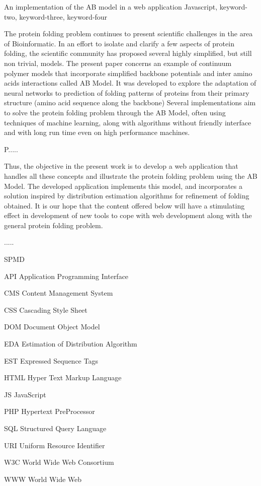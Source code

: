 \documentclass[dm,ppgcomp]{texfurg}
\begin{document}
\begin{englishabstract}
  {An implementation of the AB model in a web application}
  {Javascript, keyword-two, keyword-three, keyword-four}

The protein folding problem continues to present scientific challenges in the area of Bioinformatic. In an effort to isolate and clarify a few aspects of protein folding, the scientific community has proposed several highly simplified, but still non trivial, models. The present paper concerns an example of continuum polymer models that incorporate simplified backbone potentials and inter amino acids interactions called AB Model. It was developed to explore the adaptation of neural networks to prediction of folding patterns of proteins from their primary structure (amino acid sequence along the backbone) Several implementations aim to solve the protein folding problem through the AB Model, often using techniques of machine learning, along with algorithms without friendly interface and with long run time even on high performance machines.

P.....

Thus, the objective in the present work is to develop a web application that handles all these concepts and illustrate the protein folding problem using the AB Model. The developed application implements this model, and incorporates a solution inspired by distribution estimation algorithms for refinement of folding obtained. It is our hope that the content offered below will have a stimulating effect in development of new tools to cope with web development  along with the general protein folding problem.

.....

\end{englishabstract}

\listoffigures

\listoftables

\begin{listofabbrv}{SPMD}

        \item[API] Application Programming Interface
        \item[CMS] Content Management System
        \item[CSS] Cascading Style Sheet
        \item[DOM] Document Object Model
        \item[EDA] Estimation of Distribution Algorithm
        \item[EST] Expressed Sequence Tags
        \item[HTML] Hyper Text Markup Language
        \item[JS] JavaScript
        \item[PHP] Hypertext PreProcessor
        \item[SQL] Structured Query Language
        \item[URI] Uniform Resource Identifier
        \item[W3C] World Wide Web Consortium
        \item[WWW] World Wide Web

\end{listofabbrv}
\end{document}
